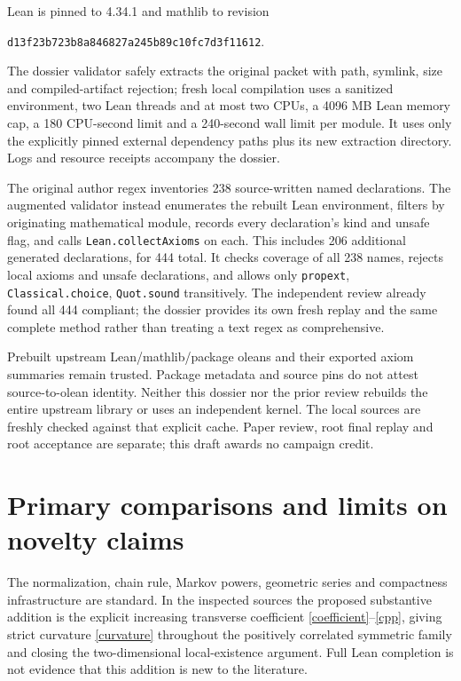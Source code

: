 \documentclass[11pt]{article}
\begin{document}
Lean is pinned to 4.34.1 and mathlib to revision
\begin{center}\small\texttt{d13f23b723b8a846827a245b89c10fc7d3f11612}.\end{center}
The dossier validator safely extracts the original packet with path, symlink, size and compiled-artifact rejection; fresh local compilation uses a sanitized environment, two Lean threads and at most two CPUs, a 4096 MB Lean memory cap, a 180 CPU-second limit and a 240-second wall limit per module. It uses only the explicitly pinned external dependency paths plus its new extraction directory. Logs and resource receipts accompany the dossier.

The original author regex inventories 238 source-written named declarations. The augmented validator instead enumerates the rebuilt Lean environment, filters by originating mathematical module, records every declaration's kind and unsafe flag, and calls \texttt{Lean.collectAxioms} on each. This includes 206 additional generated declarations, for 444 total. It checks coverage of all 238 names, rejects local axioms and unsafe declarations, and allows only \texttt{propext}, \texttt{Classical.choice}, \texttt{Quot.sound} transitively. The independent review already found all 444 compliant; the dossier provides its own fresh replay and the same complete method rather than treating a text regex as comprehensive.

Prebuilt upstream Lean/mathlib/package oleans and their exported axiom summaries remain trusted. Package metadata and source pins do not attest source-to-olean identity. Neither this dossier nor the prior review rebuilds the entire upstream library or uses an independent kernel. The local sources are freshly checked against that explicit cache. Paper review, root final replay and root acceptance are separate; this draft awards no campaign credit.

\section{Primary comparisons and limits on novelty claims}
\raggedright
The normalization, chain rule, Markov powers, geometric series and compactness infrastructure are standard. In the inspected sources the proposed substantive addition is the explicit increasing transverse coefficient \eqref{coefficient}--\eqref{cpp}, giving strict curvature \eqref{curvature} throughout the positively correlated symmetric family and closing the two-dimensional local-existence argument. Full Lean completion is not evidence that this addition is new to the literature.
\end{document}
